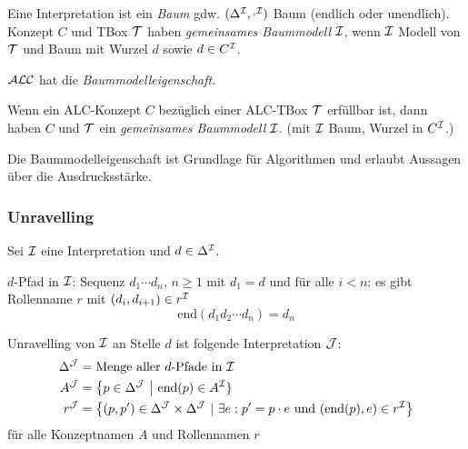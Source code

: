 Eine Interpretation ist ein \emph{Baum} gdw. $(\Delta^{\mathcal{I}}, \cdot^{\mathcal{I}})$
Baum (endlich oder unendlich). Konzept $C$ und TBox $\mathcal{T}$ haben
\emph{gemeinsames Baummodell} $\mathcal{I}$, wenn $\mathcal{I}$ Modell von $\mathcal{T}$ und Baum mit
Wurzel $d$ sowie $d \in C^{\mathcal{I}}$.


$\mathcal{A}\mathcal{L}\mathcal{C}$ hat die \emph{Baummodelleigenschaft}.

\begin{theorem}
    \label{theorem-3.6}
    \label{thm:baummodell}
Wenn ein ALC-Konzept $C$ bezüglich einer ALC-TBox $\mathcal{T}$ erfüllbar ist,
dann haben $C$ und $\mathcal{T}$ ein \emph{gemeinsames Baummodell} $\mathcal{I}$. (mit $\mathcal{I}$ Baum, Wurzel in $C^{\mathcal{I}}$.)
\end{theorem}

\begin{tafel}[TODO]

\end{tafel}

Die Baummodelleigenschaft ist Grundlage für Algorithmen und erlaubt Aussagen über die Ausdrucksstärke.

\subsubsection{Unravelling}\label{unravelling}

Sei $\mathcal{I}$ eine Interpretation und $d \in \Delta^{\mathcal{I}}$. 

$d$-Pfad in $\mathcal{I}$: Sequenz $d_1\cdots d_n$, $n \geq 1$ mit $d_1 = d$ und
für alle $i < n$: es gibt Rollenname $r$ mit $(d_i, d_{i + 1}) \in r^{\mathcal{I}}$
\[\text{end}(d_1d_2\cdots d_n) = d_n\]

\begin{definition}[Unravelling]
Unravelling von $\mathcal{I}$ an Stelle $d$ ist folgende Interpretation $\mathcal{J}$:
\begin{align*}
    \Delta^{\MJ} &= \text{Menge aller }d\text{-Pfade in }\MI\\
    A^{\MJ} &= \left\{ p \in \Delta^{\MJ}\  \right|\text{\ end}\left( p \right) \in A^\MI\}\\
    r^{\MJ} &= \left\{ \left( p,p' \right) \in \Delta^{\MJ} \times \Delta^{\MJ}\ |\ \exists e:p' = p \cdot e\ \mathrm{\text{und}}\ \left( \text{end}\left( p \right),e \right) \in r^\MI \right\}
\end{align*}
für alle Konzeptnamen $A$ und Rollennamen $r$
\end{definition}

\begin{tafel}[TODO]

\end{tafel}

